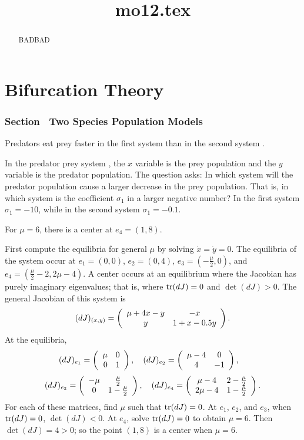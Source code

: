 \documentclass{ximera}
\title{mo12.tex}
\begin{document}
\begin{abstract}
BADBAD
\end{abstract}
\maketitle

\chapter{Bifurcation Theory}

\subsection*{Section~\protect{\ref{S:TSPM}} Two Species Population Models}

\ans Predators eat prey faster in the first system  than in 
the second system .

\soln  In the predator prey system , the $x$ variable is the
prey population and the $y$ variable is the predator population.  The
question asks: In which system will the predator population cause a
larger decrease in the prey population.  That is, in which system is
the coefficient $\sigma_1$ in  a larger negative number?  In
the first system $\sigma_1=-10$, while in the second system $\sigma_1=-0.1$.

\ans For $\mu = 6$, there is a center at $e_4 = (1,8)$.

\soln First compute the equilibria for general $\mu$ by solving
$\dot{x} = \dot{y} = 0$.  The equilibria of the system occur at
$e_1 = (0,0)$, $e_2 = (0,4)$, $e_3 = (-\frac{\mu}{2},0)$, and
$e_4 = (\frac{\mu}{2} - 2, 2\mu - 4)$.  A center occurs at an equilibrium
where the Jacobian has purely imaginary eigenvalues; that is, where
${\rm tr}{(dJ)} = 0$ and $\det{(dJ)} > 0$.  The general Jacobian of this
system is
\[
(dJ)_{(x,y)} = \left(\begin{array}{cc} \mu + 4x - y & -x\\ y &1 + x - 0.5y\end{array}\right).
\]
At the equilibria,
\[
(dJ)_{e_1} = \left(\begin{array}{rr} \mu & 0\\ 0 &1\end{array}\right), \quad
(dJ)_{e_2} = \left(\begin{array}{cc} \mu - 4 & 0\\ 4 &-1\end{array}\right), \quad
\]
\[
(dJ)_{e_3} = \left(\begin{array}{cc} -\mu & \frac{\mu}{2}\\ 0 &1 - \frac{\mu}{2}\end{array}\right), \quad
(dJ)_{e_4} = \left(\begin{array}{cc} \mu - 4 & 2 - \frac{\mu}{2}\\ 2\mu - 4 &1 -
\frac{\mu}{2}\end{array}\right).
\]
For each of these matrices, find $\mu$ such that ${\rm tr}{(dJ)} = 0$.  At
$e_1$, $e_2$, and $e_3$, when ${\rm tr}{(dJ)} = 0$, $\det{(dJ)} < 0$.
At $e_4$, solve ${\rm tr}(dJ) = 0$ to obtain $\mu = 6$.  Then $\det{(dJ)}
= 4 > 0$; so the point $(1,8)$ is a center when $\mu = 6$.
\end{document}
